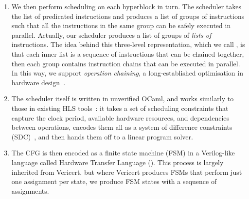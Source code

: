 \begin{enumerate}[label=\protect\blacknum{\arabic*}]
%
%
%
\item We then perform scheduling on each hyperblock in turn. The scheduler
  takes the list of predicated instructions and produces a list of groups of
  instructions such that all the instructions in the same group can be safely executed
  in parallel. Actually, our scheduler produces a list of groups of \emph{lists
    of} instructions. The idea behind this three-level representation, which we
  call \rtlpar, is that each inner list is a sequence of instructions that can
  be chained together, then each group contains instruction chains that can be
  executed in parallel. In this way, we support \emph{operation chaining}, a long-established optimisation in hardware design~\cite[p.~1101]{pangrle87_desig_tools_intel_silic_compil}.
\item The scheduler itself is written in unverified OCaml, and works similarly
  to those in existing HLS tools~\cite[]{canis11_legup}: it takes a set of scheduling
  constraints that capture the clock period, available hardware resources, and dependencies between operations, encodes them all as a system of difference constraints
  (SDC)~\cite[]{cong06_sdc}, and then hands them off to a linear program solver.

 \item The CFG is then encoded as a finite state machine (FSM) in a Verilog-like language called Hardware Transfer Language (\htl). This process is largely inherited from Vericert, but where Vericert produces FSMs that perform just one assignment per state, we produce FSM states with a sequence of assignments.


\end{enumerate}
